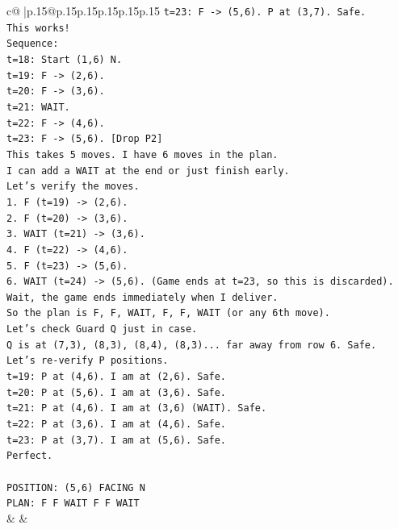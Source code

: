 \documentclass{article}
\begin{document}
{\begin{supertabular}{c@{$\;$}|p{.15\linewidth}@{}p{.15\linewidth}p{.15\linewidth}p{.15\linewidth}p{.15\linewidth}p{.15\linewidth}}
{{{\texttt{t=23: F {-}> (5,6). P at (3,7). Safe.} \\
\texttt{This works!} \\
\texttt{Sequence:} \\
\texttt{t=18: Start (1,6) N.} \\
\texttt{t=19: F {-}> (2,6).} \\
\texttt{t=20: F {-}> (3,6).} \\
\texttt{t=21: WAIT.} \\
\texttt{t=22: F {-}> (4,6).} \\
\texttt{t=23: F {-}> (5,6). {[}Drop P2{]}} \\
\texttt{This takes 5 moves. I have 6 moves in the plan.} \\
\texttt{I can add a WAIT at the end or just finish early.} \\
\texttt{Let's verify the moves.} \\
\texttt{1. F (t=19) {-}> (2,6).} \\
\texttt{2. F (t=20) {-}> (3,6).} \\
\texttt{3. WAIT (t=21) {-}> (3,6).} \\
\texttt{4. F (t=22) {-}> (4,6).} \\
\texttt{5. F (t=23) {-}> (5,6).} \\
\texttt{6. WAIT (t=24) {-}> (5,6). (Game ends at t=23, so this is discarded).} \\
\texttt{Wait, the game ends immediately when I deliver.} \\
\texttt{So the plan is F, F, WAIT, F, F, WAIT (or any 6th move).} \\
\texttt{Let's check Guard Q just in case.} \\
\texttt{Q is at (7,3), (8,3), (8,4), (8,3)... far away from row 6. Safe.} \\
\texttt{Let's re{-}verify P positions.} \\
\texttt{t=19: P at (4,6). I am at (2,6). Safe.} \\
\texttt{t=20: P at (5,6). I am at (3,6). Safe.} \\
\texttt{t=21: P at (4,6). I am at (3,6) (WAIT). Safe.} \\
\texttt{t=22: P at (3,6). I am at (4,6). Safe.} \\
\texttt{t=23: P at (3,7). I am at (5,6). Safe.} \\
\texttt{Perfect.} \\
\\ 
\texttt{POSITION: (5,6) FACING N} \\
\texttt{PLAN: F F WAIT F F WAIT} \\
            }
        }
    }
    & & \\ \\


\end{supertabular}}
\end{document}
